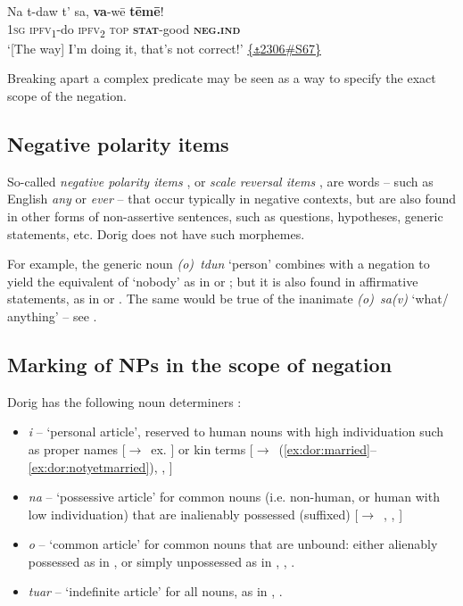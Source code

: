 \documentclass[output=paper,colorlinks,citecolor=brown,draft]{langscibook}
\begin{document}
\ea\label{ex:dor:notcorrect} 
    \gll  Na t-daw t’ sa, \textbf{va}-wē \textbf{tēmē}!\\ 
          \textsc{1sg} \textsc{ipfv\textsubscript{1}}-do \textsc{ipfv\textsubscript{2}} \textsc{top} \textbf{\textsc{stat}}-good \textbf{\textsc{neg.ind}} \\
    \glt ‘[The way] I’m doing it, that’s not correct!’ \quad \href{https://doi.org/10.24397/pangloss-0002306#S67}{\{\texttt{⚓}2306\#S67\}}
\z 

\noindent Breaking apart a complex predicate may be seen as a way to specify the exact scope of the negation.


\subsection{Negative polarity items}\label{sec:dor:4.2}

So-called \textit{negative polarity items} \citep{Baker1970}, or \textit{scale reversal items} \citep[34]{Haspelmath1997}, are words – such as English \textit{any} or \textit{ever} – that occur typically in negative contexts, but are also found in other forms of non-assertive sentences, such as questions, hypotheses, generic statements, etc. Dorig does not have such morphemes.

For example, the generic noun \textit{(o)~tdun} ‘person’ combines with a negation to yield the equivalent of ‘nobody’ as in  or ; but it is also found in affirmative statements, as in  or . The same would be true of the inanimate \textit{(o)~sa(v)} ‘what/​anything’ – see .

\subsection{Marking of NPs in the scope of negation}\label{sec:dor:4.3}

Dorig has the following noun determiners \citep{François2007}:

\begin{itemize}
\item \textit{i} – ‘personal article’, reserved to human nouns with high individuation such as proper names [\textrm{${\rightarrow}$}~ex. ] or kin terms [\textrm{${\rightarrow}$}~(\ref{ex:dor:married}--\ref{ex:dor:notyetmarried}), , ] 
\item
\textit{na} – ‘possessive article’ for common nouns (i.e. non-human, or human with low individuation) that are inalienably possessed (suffixed) [\textrm{${\rightarrow}$}~, , ]
\item 
\textit{o} – ‘common article’ for common nouns that are unbound: either alienably possessed as in , or simply unpossessed as in , , .
\item 
\textit{tuar} – ‘indefinite article’ for all nouns, as in , .
\end{itemize}
\end{document}
